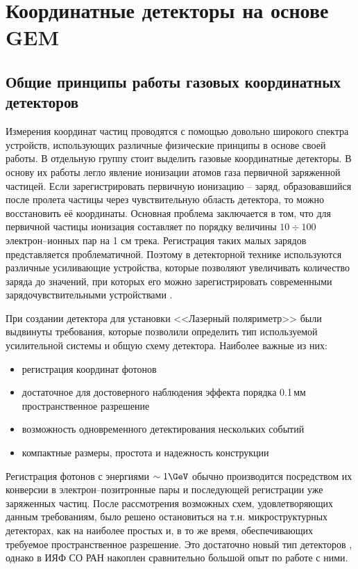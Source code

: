 \vspace{24pt}
\chapter{Координатные детекторы на основе GEM}
\label{sec:coor_GEM}
\section{Общие принципы работы газовых координатных детекторов}
Измерения координат частиц проводятся с помощью довольно широкого спектра устройств, использующих различные физические принципы в основе своей работы. В отдельную группу стоит выделить газовые координатные детекторы. В основу их работы легло явление ионизации атомов газа первичной заряженной частицей. Если зарегистрировать первичную ионизацию -- заряд, образовавшийся после пролета частицы через чувствительную область детектора, то можно восстановить её координаты. Основная проблема заключается в том, что для первичной частицы ионизация составляет по порядку величины $10 \div 100$ электрон--ионных пар на 1 см трека. Регистрация таких малых зарядов представляется проблематичной. Поэтому в детекторной технике используются различные усиливающие устройства, которые позволяют увеличивать количество заряда до значений, при которых его можно зарегистрировать современными зарядочувствительными устройствами \cite{grupen}.
\par При создании детектора для установки <<Лазерный поляриметр>> были выдвинуты требования, которые позволили определить тип используемой усилительной системы и общую схему детектора. Наиболее важные из них: 
\begin{itemize}
	\item регистрация координат фотонов
	\item достаточное для достоверного наблюдения эффекта порядка 0.1\,мм пространственное разрешение 
	\item возможность одновременного детектирования нескольких событий 
	\item компактные размеры, простота и надежность конструкции
\end{itemize}
Регистрация фотонов с энергиями $\sim1\GeV$ обычно производится посредством их конверсии в электрон--позитронные пары и последующей регистрации уже заряженных частиц. После рассмотрения возможных схем, удовлетворяющих данным требованиям, было решено остановиться на т.н. микроструктурных детекторах, как на наиболее простых и, в то же время, обеспечивающих требуемое пространственное разрешение. Это достаточно новый тип детекторов \cite{sauli}, однако в ИЯФ СО РАН накоплен сравнительно большой опыт по работе с ними.
